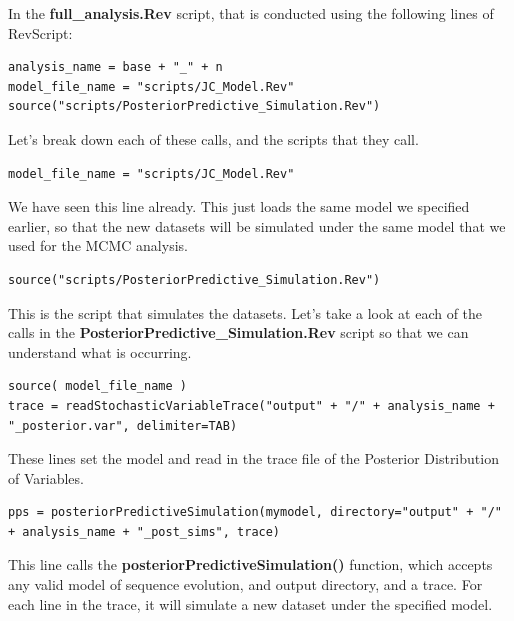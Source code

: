 In the \textbf{full\_analysis.Rev} script, that is conducted using the following lines of RevScript: 
{\tt \begin{snugshade*}
\begin{lstlisting}
analysis_name = base + "_" + n
model_file_name = "scripts/JC_Model.Rev"
source("scripts/PosteriorPredictive_Simulation.Rev")
\end{lstlisting}
\end{snugshade*}}

Let's break down each of these calls, and the scripts that they call. 
{\tt \begin{snugshade*}
\begin{lstlisting}
model_file_name = "scripts/JC_Model.Rev"
\end{lstlisting}
\end{snugshade*}}
We have seen this line already. This just loads the same model we specified earlier, so that the new 
datasets will be simulated under the same model that we used for the MCMC analysis. 

{\tt \begin{snugshade*}
\begin{lstlisting}
source("scripts/PosteriorPredictive_Simulation.Rev")
\end{lstlisting}
\end{snugshade*}}
This is the script that simulates the datasets. Let's take a look at each of the calls in the \textbf{PosteriorPredictive\_Simulation.Rev} script so 
that we can understand what is occurring. 

{\tt \begin{snugshade*}
\begin{lstlisting}
source( model_file_name )
trace = readStochasticVariableTrace("output" + "/" + analysis_name + "_posterior.var", delimiter=TAB)
\end{lstlisting}
\end{snugshade*}}
These lines set the model and read in the trace file of the Posterior Distribution of Variables.

{\tt \begin{snugshade*}
\begin{lstlisting}
pps = posteriorPredictiveSimulation(mymodel, directory="output" + "/" + analysis_name + "_post_sims", trace)
\end{lstlisting}
\end{snugshade*}}
This line calls the \textbf{posteriorPredictiveSimulation()} function, which accepts any valid model of sequence evolution, and output directory, and a trace. For each line in the trace, it will simulate a new dataset under the specified model.

